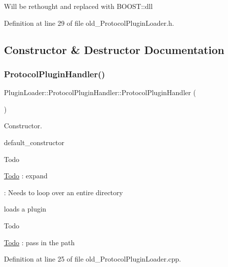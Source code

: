 Will be rethought and replaced with B\+O\+O\+S\+T\+::dll 

Definition at line 29 of file old\+\_\+\+Protocol\+Plugin\+Loader.\+h.



\subsection{Constructor \& Destructor Documentation}
\mbox{\label{classPluginLoader_1_1ProtocolPluginHandler_a05cf352c880a167e5754e76e14b3db8c}} 
\subsubsection{\texorpdfstring{ProtocolPluginHandler()}{ProtocolPluginHandler()}}
{\footnotesize\ttfamily Plugin\+Loader\+::\+Protocol\+Plugin\+Handler\+::\+Protocol\+Plugin\+Handler (\begin{DoxyParamCaption}{ }\end{DoxyParamCaption})}



Constructor. 

default\+\_\+constructor

\begin{DoxyRefDesc}{Todo}
\item[\mbox{\hyperlink{todo__todo000017}{Todo}}]\+: expand 

\+: Needs to loop over an entire directory \end{DoxyRefDesc}


loads a plugin \begin{DoxyRefDesc}{Todo}
\item[\mbox{\hyperlink{todo__todo000018}{Todo}}]\+: pass in the path \end{DoxyRefDesc}


Definition at line 25 of file old\+\_\+\+Protocol\+Plugin\+Loader.\+cpp.

\mbox{\label{classPluginLoader_1_1ProtocolPluginHandler_a550c8ff8bb4fe793abe02d4be72f9b5d}} 
